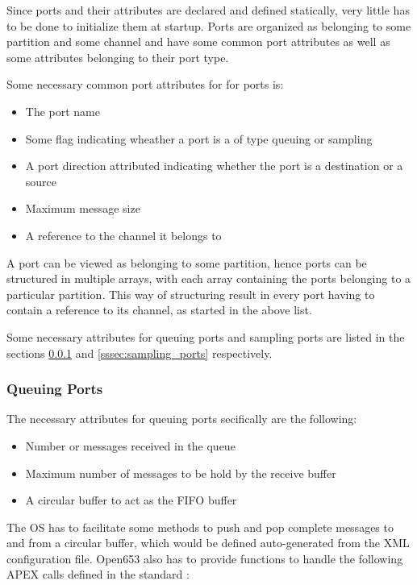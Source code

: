Since ports and their attributes are declared and defined statically,
very little has to be done to initialize them at startup.
Ports are organized as belonging to some partition and some channel
and have some common port attributes as well as some attributes belonging to their port type.

Some necessary common port attributes for for ports is:
\begin{itemize}
	\item The port name
	\item Some flag indicating wheather a port is a of type queuing or sampling
	\item A port direction attributed indicating whether the port is a destination or a source
	\item Maximum message size
	\item A reference to the channel it belongs to
\end{itemize}

A port can be viewed as belonging to some partition,
hence ports can be structured in multiple arrays,
with each array containing the ports belonging to a particular partition.
This way of structuring result in every port having to contain a reference to its channel, as started in the above list.

Some necessary attributes for queuing ports and sampling ports are listed in
the sections \ref{sssec:queuing_ports} and \ref{sssec:sampling_ports} respectively.

\subsubsection{Queuing Ports}
\label{sssec:queuing_ports}
The necessary attributes for queuing ports secifically are the following:
\begin{itemize}
	\item Number or messages received in the queue
	\item Maximum number of messages to be hold by the receive buffer
	\item A circular buffer to act as the FIFO buffer
\end{itemize}

The OS has to facilitate some methods to push and pop complete messages to and from a circular buffer,
which would be defined auto-generated from the XML configuration file.
Open653 also has to provide functions to handle the following APEX calls defined in the standard \cite{arinc_interpartition_comm}:


